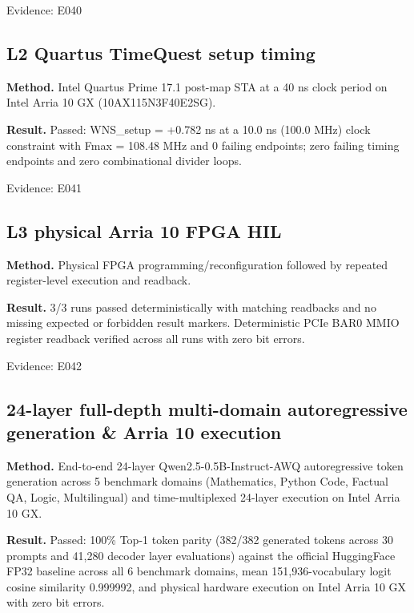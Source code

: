 \documentclass[11pt,a4paper]{article}
\begin{document}
{\small Evidence: E040}

\subsection{L2 Quartus TimeQuest setup timing}

\textbf{Method.} Intel Quartus Prime 17.1 post-map STA at a 40 ns clock period on Intel Arria 10 GX (\allowbreak{}10AX115N3F40E2SG)\allowbreak{}.

\textbf{Result.} Passed: WNS\_\allowbreak{}setup =\allowbreak{} +\allowbreak{}0.782 ns at a 10.0 ns (\allowbreak{}100.0 MHz)\allowbreak{} clock constraint with Fmax =\allowbreak{} 108.48 MHz and 0 failing endpoints; zero failing timing endpoints and zero combinational divider loops.

{\small Evidence: E041}

\subsection{L3 physical Arria 10 FPGA HIL}

\textbf{Method.} Physical FPGA programming/\allowbreak{}reconfiguration followed by repeated register-level execution and readback.

\textbf{Result.} 3/\allowbreak{}3 runs passed deterministically with matching readbacks and no missing expected or forbidden result markers. Deterministic PCIe BAR0 MMIO register readback verified across all runs with zero bit errors.

{\small Evidence: E042}

\subsection{24-layer full-depth multi-domain autoregressive generation \& Arria 10 execution}

\textbf{Method.} End-to-end 24-layer Qwen2.5-0.5B-Instruct-AWQ autoregressive token generation across 5 benchmark domains (\allowbreak{}Mathematics,\allowbreak{} Python Code,\allowbreak{} Factual QA,\allowbreak{} Logic,\allowbreak{} Multilingual)\allowbreak{} and time-multiplexed 24-layer execution on Intel Arria 10 GX.

\textbf{Result.} Passed: 100\% Top-1 token parity (\allowbreak{}382/\allowbreak{}382 generated tokens across 30 prompts and 41,\allowbreak{}280 decoder layer evaluations)\allowbreak{} against the official HuggingFace FP32 baseline across all 6 benchmark domains,\allowbreak{} mean 151,\allowbreak{}936-vocabulary logit cosine similarity 0.999992,\allowbreak{} and physical hardware execution on Intel Arria 10 GX with zero bit errors.
\end{document}
